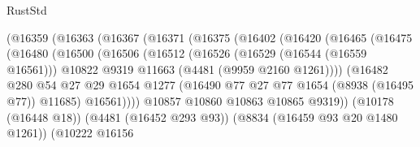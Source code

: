\begin{lexlean}{RustStd}
\begin{coremodule}
                              (@16359
                                (@16363
                                  (@16367
                                    (@16371
                                      (@16375
                                        (@16402
                                          (@16420
                                            (@16465
                                              (@16475
                                                (@16480
                                                  (@16500
                                                    (@16506
                                                      (@16512
                                                        (@16526
                                                          (@16529 (@16544 (@16559 @16561)))
                                                          @10822
                                                          @9319
                                                          @11663
                                                          (@4481 (@9959 @2160 @1261))))
                                                      (@16482
                                                        @280
                                                        @54
                                                        @27
                                                        @29
                                                        @1654
                                                        @1277
                                                        (@16490
                                                          @77
                                                          @27
                                                          @77
                                                          @1654
                                                          (@8938 (@16495 @77))
                                                          @11685)
                                                        @16561))))
                                                @10857
                                                @10860
                                                @10863
                                                @10865
                                                @9319))
                                            (@10178 (@16448 @18))
                                            (@4481 (@16452 @293 @93))
                                            (@8834 (@16459 @93 @20 @1480 @1261))
                                            (@10222
                                              @16156

\end{coremodule}
\end{lexlean}
